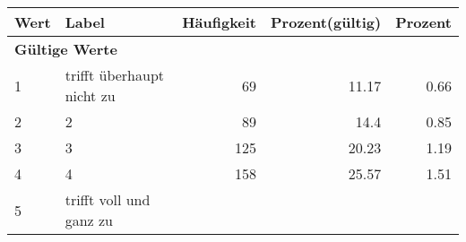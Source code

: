      \begin{longtable}{lXrrr}
     \toprule
     \textbf{Wert} & \textbf{Label} & \textbf{Häufigkeit} & \textbf{Prozent(gültig)} & \textbf{Prozent} \\
     \endhead
     \midrule
     \multicolumn{5}{l}{\textbf{Gültige Werte}}\\

     1 &
     \multicolumn{1}{X}{ trifft überhaupt nicht zu   } &


       \num{69} &
       \num[round-mode=places,round-precision=2]{11,17} &
         \num[round-mode=places,round-precision=2]{0,66} \\

     2 &
     \multicolumn{1}{X}{ 2   } &


       \num{89} &
       \num[round-mode=places,round-precision=2]{14,4} &
         \num[round-mode=places,round-precision=2]{0,85} \\

     3 &
     \multicolumn{1}{X}{ 3   } &


       \num{125} &
       \num[round-mode=places,round-precision=2]{20,23} &
         \num[round-mode=places,round-precision=2]{1,19} \\

     4 &
     \multicolumn{1}{X}{ 4   } &


       \num{158} &
       \num[round-mode=places,round-precision=2]{25,57} &
         \num[round-mode=places,round-precision=2]{1,51} \\

     5 &
     \multicolumn{1}{X}{ trifft voll und ganz zu   } &



\end{longtable}
